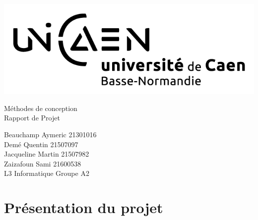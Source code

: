 \documentclass[a4paper,12pt]{article} %
\begin{document}


\begin{titlepage}

\includegraphics[scale=0.3]{images/unicaen.png}

\vspace{7cm}

\begin{center}

\begin{Huge}
Méthodes de conception\\
Rapport de Projet\\
\end{Huge}
\vspace{2cm}
\begin{large}
Beauchamp Aymeric 21301016\\
Demé Quentin 21507097\\
Jacqueline Martin 21507982\\
Zaizafoun Sami 21600538\\
\vspace{1cm}
L3 Informatique  Groupe A2
\end{large}

\end{center}
\end{titlepage}



\newpage

\tableofcontents

\newpage


\section*{Présentation du projet}
\end{document}
